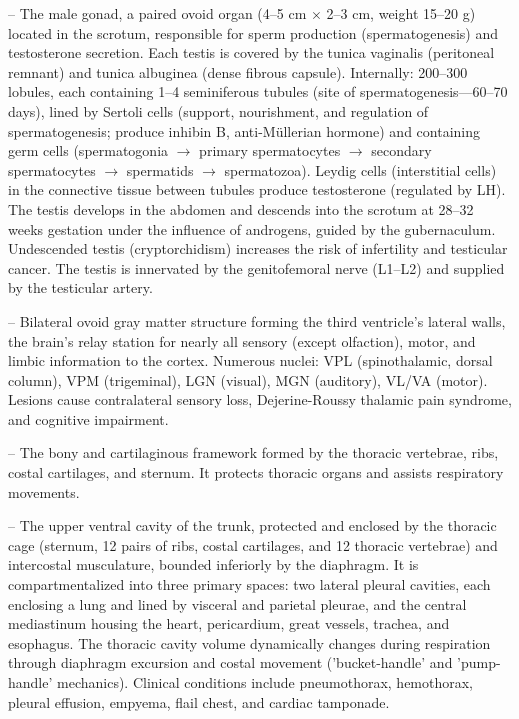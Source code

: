 -- The male gonad, a paired ovoid organ (4--5 cm \(\times\) 2--3 cm, weight 15--20 g) located in the scrotum, responsible for sperm production (spermatogenesis) and testosterone secretion. Each testis is covered by the tunica vaginalis (peritoneal remnant) and tunica albuginea (dense fibrous capsule). Internally: 200--300 lobules, each containing 1--4 seminiferous tubules (site of spermatogenesis—60--70 days), lined by Sertoli cells (support, nourishment, and regulation of spermatogenesis; produce inhibin B, anti-Müllerian hormone) and containing germ cells (spermatogonia $\rightarrow$ primary spermatocytes $\rightarrow$ secondary spermatocytes $\rightarrow$ spermatids $\rightarrow$ spermatozoa). Leydig cells (interstitial cells) in the connective tissue between tubules produce testosterone (regulated by LH). The testis develops in the abdomen and descends into the scrotum at 28--32 weeks gestation under the influence of androgens, guided by the gubernaculum. Undescended testis (cryptorchidism) increases the risk of infertility and testicular cancer. The testis is innervated by the genitofemoral nerve (L1--L2) and supplied by the testicular artery.

-- Bilateral ovoid gray matter structure forming the third ventricle's lateral walls, the brain's relay station for nearly all sensory (except olfaction), motor, and limbic information to the cortex. Numerous nuclei: VPL (spinothalamic, dorsal column), VPM (trigeminal), LGN (visual), MGN (auditory), VL/VA (motor). Lesions cause contralateral sensory loss, Dejerine-Roussy thalamic pain syndrome, and cognitive impairment.

-- The bony and cartilaginous framework formed by the thoracic vertebrae, ribs, costal cartilages, and sternum. It protects thoracic organs and assists respiratory movements.

-- The upper ventral cavity of the trunk, protected and enclosed by the thoracic cage (sternum, 12 pairs of ribs, costal cartilages, and 12 thoracic vertebrae) and intercostal musculature, bounded inferiorly by the diaphragm. It is compartmentalized into three primary spaces: two lateral pleural cavities, each enclosing a lung and lined by visceral and parietal pleurae, and the central mediastinum housing the heart, pericardium, great vessels, trachea, and esophagus. The thoracic cavity volume dynamically changes during respiration through diaphragm excursion and costal movement ('bucket-handle' and 'pump-handle' mechanics). Clinical conditions include pneumothorax, hemothorax, pleural effusion, empyema, flail chest, and cardiac tamponade.

